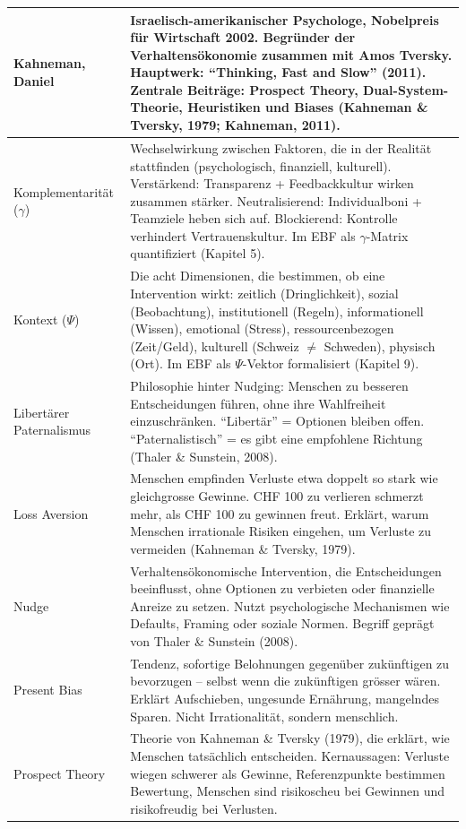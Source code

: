 \documentclass[11pt,a4paper]{article}
\begin{document}
\begin{longtable}{@{}L{4cm}L{10cm}@{}}
\midrule
Kahneman, Daniel & Israelisch-amerikanischer Psychologe, Nobelpreis für Wirtschaft 2002. Begründer der Verhaltensökonomie zusammen mit Amos Tversky. Hauptwerk: ``Thinking, Fast and Slow'' (2011). Zentrale Beiträge: Prospect Theory, Dual-System-Theorie, Heuristiken und Biases (Kahneman \& Tversky, 1979; Kahneman, 2011). \\
\midrule
Komplementarität ($\gamma$) & Wechselwirkung zwischen Faktoren, die in der Realität stattfinden (psychologisch, finanziell, kulturell). Verstärkend: Transparenz + Feedbackkultur wirken zusammen stärker. Neutralisierend: Individualboni + Teamziele heben sich auf. Blockierend: Kontrolle verhindert Vertrauenskultur. Im EBF als $\gamma$-Matrix quantifiziert (Kapitel 5). \\
\midrule
Kontext ($\Psi$) & Die acht Dimensionen, die bestimmen, ob eine Intervention wirkt: zeitlich (Dringlichkeit), sozial (Beobachtung), institutionell (Regeln), informationell (Wissen), emotional (Stress), ressourcenbezogen (Zeit/Geld), kulturell (Schweiz $\neq$ Schweden), physisch (Ort). Im EBF als $\Psi$-Vektor formalisiert (Kapitel 9). \\
\midrule
Libertärer Paternalismus & Philosophie hinter Nudging: Menschen zu besseren Entscheidungen führen, ohne ihre Wahlfreiheit einzuschränken. ``Libertär'' = Optionen bleiben offen. ``Paternalistisch'' = es gibt eine empfohlene Richtung (Thaler \& Sunstein, 2008). \\
\midrule
Loss Aversion & Menschen empfinden Verluste etwa doppelt so stark wie gleichgrosse Gewinne. CHF 100 zu verlieren schmerzt mehr, als CHF 100 zu gewinnen freut. Erklärt, warum Menschen irrationale Risiken eingehen, um Verluste zu vermeiden (Kahneman \& Tversky, 1979). \\
\midrule
Nudge & Verhaltensökonomische Intervention, die Entscheidungen beeinflusst, ohne Optionen zu verbieten oder finanzielle Anreize zu setzen. Nutzt psychologische Mechanismen wie Defaults, Framing oder soziale Normen. Begriff geprägt von Thaler \& Sunstein (2008). \\
\midrule
Present Bias & Tendenz, sofortige Belohnungen gegenüber zukünftigen zu bevorzugen -- selbst wenn die zukünftigen grösser wären. Erklärt Aufschieben, ungesunde Ernährung, mangelndes Sparen. Nicht Irrationalität, sondern menschlich. \\
\midrule
Prospect Theory & Theorie von Kahneman \& Tversky (1979), die erklärt, wie Menschen tatsächlich entscheiden. Kernaussagen: Verluste wiegen schwerer als Gewinne, Referenzpunkte bestimmen Bewertung, Menschen sind risikoscheu bei Gewinnen und risikofreudig bei Verlusten. \\

\end{longtable}
\end{document}
